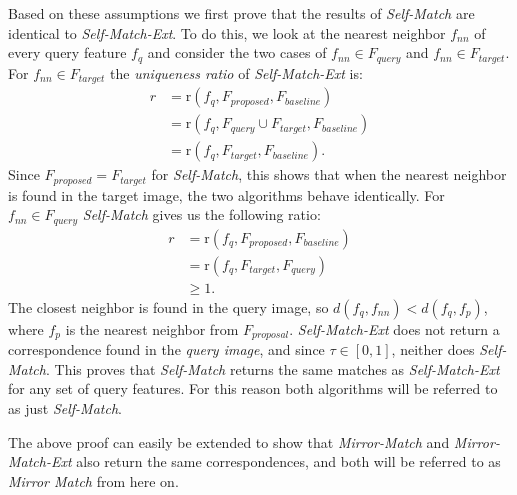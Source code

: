 \documentclass[10pt,journal,cspaper,compsoc]{IEEEtran}
\begin{document}
Based on these assumptions we first prove that the results of 
\emph{Self-Match} are identical to \emph{Self-Match-Ext}. To do this, we 
look at the nearest neighbor $f_{nn}$ of every query feature $f_{q}$ and 
consider the two cases of $f_{nn} \in F_{query}$ and $f_{nn} \in
F_{target}$. For $f_{nn} \in F_{target}$ the \emph{uniqueness ratio} of 
\emph{Self-Match-Ext} is:
\begin{align*}
    r &= \text{r}(f_{q}, F_{proposed}, F_{baseline}) \\
        &= \text{r}(f_{q}, F_{query} \cup F_{target}, F_{baseline})\\
        &= \text{r}(f_{q}, F_{target}, F_{baseline}).
\end{align*}
Since $F_{proposed} = F_{target}$ for \emph{Self-Match}, this shows that
when the nearest neighbor is found in the target image, the two 
algorithms behave identically. For $f_{nn} \in F_{query}$ 
\emph{Self-Match} gives us the following ratio:
\begin{align*}
    r &= \text{r}(f_{q}, F_{proposed}, F_{baseline}) \\
        &= \text{r}(f_{q}, F_{target}, F_{query}) \\
        &\geq 1.
\end{align*}
The closest neighbor is found in the query image, so $d(f_{q}, f_{nn}) < 
d(f_{q},f_{p})$, where $f_{p}$ is the nearest neighbor from 
$F_{proposal}$. \emph{Self-Match-Ext} does not return a correspondence 
found in the \emph{query image}, and since $\tau \in [0,1]$, neither does 
\emph{Self-Match}. This proves that 
\emph{Self-Match} returns the same matches as \emph{Self-Match-Ext} for any set of query features. For 
this reason both algorithms will be referred to as just 
\emph{Self-Match}.

The above proof can easily be extended to show that \emph{Mirror-Match} and \emph{Mirror-Match-Ext} also return the same correspondences, and 
both will be referred to as \emph{Mirror Match} from here on.
\end{document}
